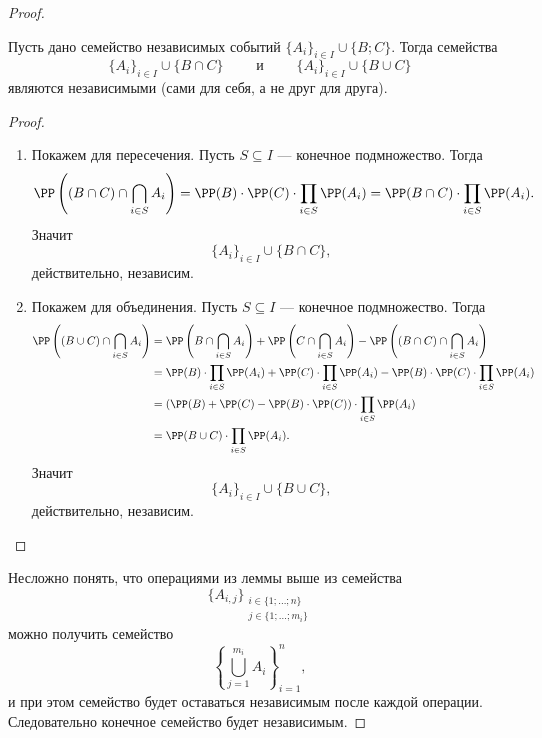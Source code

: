 \documentclass[12pt,a4paper]{article}
\begin{document}
    \begin{proof}
        \begin{lemma}
            Пусть дано семейство независимых событий $\{A_i\}_{i \in I} \cup \{B; C\}$. Тогда семейства
            \[\{A_i\}_{i \in I} \cup \{B \cap C\} \qquad \text{ и } \qquad \{A_i\}_{i \in I} \cup \{B \cup C\}\]
            являются независимыми (сами для себя, а не друг для друга).
        \end{lemma}

        \begin{proof}
            \begin{enumerate}
                \item Покажем для пересечения. Пусть $S \subseteq I$ --- конечное подмножество. Тогда
                    \[
                        \PP\left((B \cap C) \cap \bigcap_{i \in S} A_i\right)
                        = \PP(B) \cdot \PP(C) \cdot \prod_{i \in S} \PP(A_i)
                        = \PP(B \cap C) \cdot \prod_{i \in S} \PP(A_i).
                    \]
                    Значит
                    \[\{A_i\}_{i \in I} \cup \{B \cap C\},\]
                    действительно, независим.
                \item Покажем для объединения. Пусть $S \subseteq I$ --- конечное подмножество. Тогда
                    \begin{align*}
                        \PP\left((B \cup C) \cap \bigcap_{i \in S} A_i\right)
                        &= \PP\left(B \cap \bigcap_{i \in S} A_i\right) + \PP\left(C \cap \bigcap_{i \in S} A_i\right) - \PP\left((B \cap C) \cap \bigcap_{i \in S} A_i\right)\\
                        &= \PP(B) \cdot \prod_{i \in S} \PP(A_i) + \PP(C) \cdot \prod_{i \in S} \PP(A_i) - \PP(B) \cdot \PP(C) \cdot \prod_{i \in S} \PP(A_i)\\
                        &= (\PP(B) + \PP(C) - \PP(B) \cdot \PP(C)) \cdot \prod_{i \in S} \PP(A_i)\\
                        &= \PP(B \cup C) \cdot \prod_{i \in S} \PP(A_i).
                    \end{align*}
                    Значит
                    \[\{A_i\}_{i \in I} \cup \{B \cup C\},\]
                    действительно, независим.
            \end{enumerate}
        \end{proof}

        Несложно понять, что операциями из леммы выше из семейства
        \[\{A_{i, j}\}_{\substack{i \in \{1; \dots; n\}\\ j \in \{1; \dots; m_i\}}}\]
        можно получить семейство
        \[\left\{\bigcup_{j = 1}^{m_i} A_i\right\}_{i=1}^n,\]
        и при этом семейство будет оставаться независимым после каждой операции. Следовательно конечное семейство будет независимым.
    \end{proof}
\end{document}
